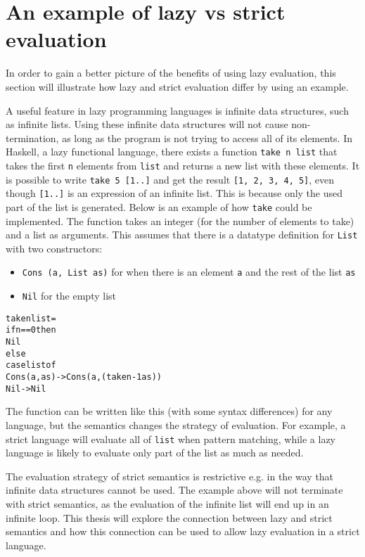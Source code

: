\section{An example of lazy vs strict evaluation}
\label{intro:Example}
In order to gain a better picture of the benefits of using lazy evaluation,
this section will illustrate how lazy and strict evaluation differ by using
an example.

A useful feature in lazy programming languages is
infinite data structures, such as infinite lists. Using
these infinite data structures will not cause non-termination, as long as the
program is not trying to access all of its elements. In Haskell, a lazy
functional language, there exists a function \texttt{take n list} that takes the
first \texttt{n} elements from \texttt{list} and returns a new list with
these elements. It is possible to write \texttt{take 5 [1..]} and get the
result \texttt{[1, 2, 3, 4, 5]}, even though \texttt{[1..]} is
an expression of an infinite list. This is because only the used part of the
list is generated.
Below is an example of how \texttt{take} could be implemented. The function
takes an integer (for the number of elements to take) and a list as arguments.
This assumes that there is a datatype definition for \texttt{List} with two
constructors:
\begin{itemize}
  \item \texttt{Cons (a, List as)} for when there is an element \texttt{a} and the rest of the list \texttt{as}
  \item \texttt{Nil} for the empty list
\end{itemize}

\begin{alltt}
  take n list =
    if n == 0 then
      Nil
    else
      case list of
        Cons (a, as) -> Cons (a, (take n-1 as))
        Nil          -> Nil
\end{alltt}

\noindent The function can be written like this (with some syntax differences)
for any language, but the semantics
changes the strategy of evaluation. For example, a strict language will evaluate
all of \texttt{list} when pattern matching, while a lazy language is likely to
evaluate only part of the list as much as needed. 

The evaluation strategy of strict semantics is restrictive e.g. in the way that
infinite data structures cannot be used. The example above will not terminate
with strict semantics, as the evaluation of the infinite list will end up in an
infinite loop. This thesis will explore the connection between lazy and strict
semantics and how this connection can be used to allow lazy evaluation in a
strict language.
